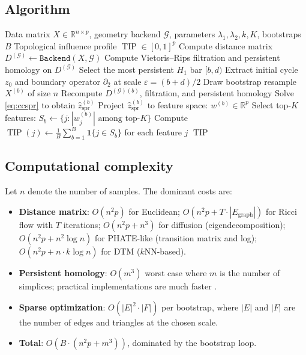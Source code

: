 \documentclass[11pt]{article}
\DeclareMathOperator{\TIP}{TIP}
\begin{document}
\subsection{Algorithm}

\begin{algorithm}[h]
\caption{CC-SPR Pipeline}
\label{alg:ccspr}
\begin{algorithmic}[1]
\REQUIRE Data matrix $X \in \mathbb{R}^{n \times p}$, geometry backend $\mathcal{G}$, parameters $\lambda_1, \lambda_2, k, K$, bootstraps $B$
\ENSURE Topological influence profile $\TIP \in [0,1]^p$
\STATE Compute distance matrix $D^{(\mathcal{G})} \gets \texttt{Backend}(X, \mathcal{G})$
\STATE Compute Vietoris--Rips filtration and persistent homology on $D^{(\mathcal{G})}$
\STATE Select the most persistent $H_1$ bar $[b, d)$
\STATE Extract initial cycle $z_0$ and boundary operator $\partial_2$ at scale $\varepsilon = (b + d)/2$
    \STATE Draw bootstrap resample $X^{(b)}$ of size $n$
    \STATE Recompute $D^{(\mathcal{G})(b)}$, filtration, and persistent homology
    \STATE Solve \eqref{eq:ccspr} to obtain $\hat{z}_{\mathrm{spr}}^{(b)}$
    \STATE Project $\hat{z}_{\mathrm{spr}}^{(b)}$ to feature space: $w^{(b)} \in \mathbb{R}^p$
    \STATE Select top-$K$ features: $S_b \gets \{j : |w^{(b)}_j| \text{ among top-}K\}$
\ENDFOR
\STATE Compute $\TIP(j) \gets \frac{1}{B} \sum_{b=1}^B \mathbf{1}\{j \in S_b\}$ for each feature $j$
\RETURN $\TIP$
\end{algorithmic}
\end{algorithm}

\subsection{Computational complexity}

Let $n$ denote the number of samples.
The dominant costs are:
\begin{itemize}[leftmargin=1.5em]
\item \textbf{Distance matrix}: $O(n^2 p)$ for Euclidean; $O(n^2 p + T \cdot |E_{\text{graph}}|)$ for Ricci flow with $T$ iterations; $O(n^2 p + n^3)$ for diffusion (eigendecomposition); $O(n^2 p + n^2 \log n)$ for PHATE-like (transition matrix and log); $O(n^2 p + n \cdot k \log n)$ for DTM ($k$NN-based).
\item \textbf{Persistent homology}: $O(m^3)$ worst case where $m$ is the number of simplices; practical implementations are much faster \cite{gudhi2014}.
\item \textbf{Sparse optimization}: $O(|E|^2 \cdot |F|)$ per bootstrap, where $|E|$ and $|F|$ are the number of edges and triangles at the chosen scale.
\item \textbf{Total}: $O(B \cdot (n^2 p + m^3))$, dominated by the bootstrap loop.
\end{itemize}
\end{document}
